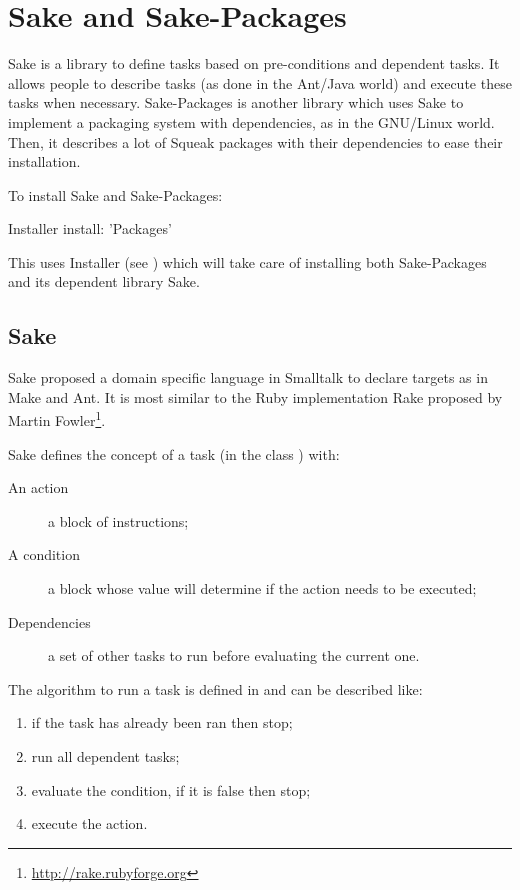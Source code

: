 \documentclass[a4paper,10pt,twoside]{book}
\begin{document}
\fi
\sloppy
\chapter{Sake and Sake-Packages}

Sake is a library to define tasks based on pre-conditions and
dependent tasks. It allows people to describe tasks (as done in the
Ant/Java world) and execute these tasks when necessary.  Sake-Packages is
another library which uses Sake to implement a packaging system with
dependencies, as in the GNU/Linux world. Then, it describes a lot of
Squeak packages with their dependencies to ease their installation.

To install Sake and Sake-Packages:

\begin{code}
  Installer install: 'Packages'
\end{code}

This uses Installer (see ) which will take care of
installing both Sake-Packages and its dependent library Sake.

\section{Sake}

Sake proposed a domain specific language in Smalltalk to declare
targets as in Make and Ant. It is most similar to the Ruby
implementation Rake proposed by Martin
Fowler\footnote{\url{http://rake.rubyforge.org}}.

Sake defines the concept of a task (in the class ) with:
\begin{description}
\item[An action] a block of instructions;
\item[A condition] a block whose value will determine if the action
  needs to be executed;
\item[Dependencies] a set of other tasks to run before evaluating the
  current one.
\end{description}

The algorithm to run a task is defined in
 and can be described like:

\begin{enumerate}
\item if the task has already been ran then stop;
\item run all dependent tasks;
\item evaluate the condition, if it is false then stop;
\item execute the action.
\end{enumerate}
\end{document}
